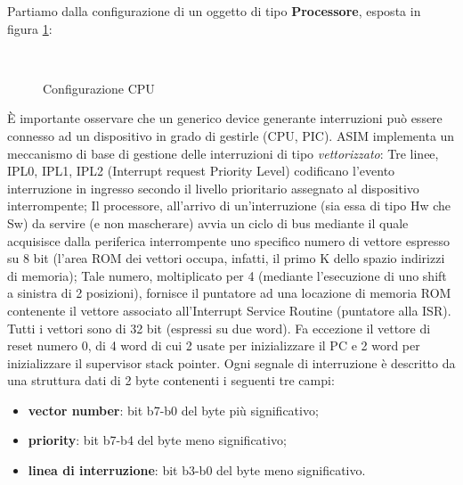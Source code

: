 Partiamo dalla configurazione di un oggetto di tipo \textbf{Processore}, esposta in figura \ref{img:cfg_CPU}:
\begin{figure}[htbp]
    \centering
    \\[0.5cm]

    \caption{Configurazione CPU}
    \label{img:cfg_CPU}
\end{figure}

\uppercase{è} importante osservare che un generico device generante interruzioni può essere connesso ad un dispositivo in grado di gestirle (CPU, PIC). ASIM implementa un meccanismo di base di gestione delle interruzioni di tipo \textit{vettorizzato}: Tre linee, IPL0, IPL1, IPL2 (Interrupt request Priority Level) codificano l'evento interruzione in ingresso secondo il livello prioritario assegnato al dispositivo interrompente; Il processore, all'arrivo di un'interruzione (sia essa di tipo Hw che Sw) da servire (e non mascherare) avvia un ciclo di bus mediante il quale acquisisce dalla periferica interrompente uno specifico numero di vettore espresso su 8 bit (l'area ROM dei vettori occupa, infatti, il primo K dello spazio indirizzi di memoria); Tale numero, moltiplicato per 4 (mediante l'esecuzione di uno shift a sinistra di 2 posizioni), fornisce il puntatore ad una locazione di memoria ROM contenente il vettore associato all'Interrupt Service Routine (puntatore alla ISR).
Tutti i vettori sono di 32 bit (espressi su due word). Fa eccezione il vettore di reset numero 0, di 4 word di cui 2 usate per inizializzare il PC e 2 word per inizializzare il supervisor stack pointer.
Ogni segnale di interruzione è descritto da una struttura dati di 2 byte contenenti i seguenti tre campi:

\begin{itemize}
    \item \textbf{vector number}: bit b7-b0 del byte più significativo;
    \item \textbf{priority}: bit b7-b4 del byte meno significativo;
    \item \textbf{linea di interruzione}: bit b3-b0 del byte meno significativo.
\end{itemize}

